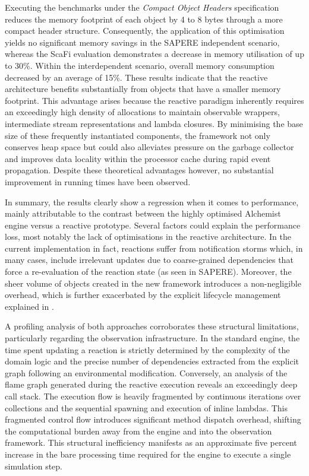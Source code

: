 Executing the benchmarks under the \emph{Compact Object Headers} specification
reduces the memory footprint of each object by 4 to 8 bytes through a more
compact header structure. Consequently, the application of this optimisation
yields no significant memory savings in the SAPERE independent scenario,
whereas the ScaFi evaluation demonstrates a decrease in memory utilisation of
up to 30\%. Within the interdependent scenario, overall memory consumption
decreased by an average of 15\%. These results indicate that the reactive
architecture benefits substantially from objects that have a smaller memory
footprint. This advantage arises because the reactive paradigm inherently
requires an exceedingly high density of allocations to maintain observable
wrappers, intermediate stream representations and lambda closures. By
minimising the base size of these frequently instantiated components, the
framework not only conserves heap space but could also alleviates pressure on
the garbage collector and improves data locality within the processor cache
during rapid event propagation. Despite these theoretical advantages however,
no substantial improvement in running times have been observed.

In summary, the results clearly show a regression when it comes to performance,
mainly attributable to the contrast between the highly optimised Alchemist
engine versus a reactive prototype. Several factors could explain the
performance loss, most notably the lack of optimisations in the reactive
architecture. In the current implementation in fact, reactions suffer from
notification storms which, in many cases, include irrelevant updates due to
coarse-grained dependencies that force a re-evaluation of the reaction state
(as seen in SAPERE). Moreover, the sheer volume of objects created in the new
framework introduces a non-negligible overhead, which is further exacerbated by
the explicit lifecycle management explained in .

A profiling analysis of both approaches corroborates these structural
limitations, particularly regarding the observation infrastructure. In the
standard engine, the time spent updating a reaction is strictly determined by
the complexity of the domain logic and the precise number of dependencies
extracted from the explicit graph following an environmental modification.
Conversely, an analysis of the flame graph generated during the reactive
execution reveals an exceedingly deep call stack. The execution flow is heavily
fragmented by continuous iterations over collections and the sequential
spawning and execution of inline lambdas. This fragmented control flow
introduces significant method dispatch overhead, shifting the computational
burden away from the engine and into the observation framework. This structural
inefficiency manifests as an approximate five percent increase in the bare
processing time required for the engine to execute a single simulation step.

